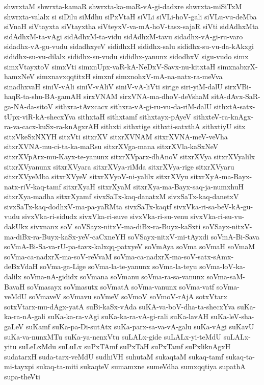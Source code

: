 {shwrxtaM
shwrxta-kamaR
shwrxta-ka-maR-vA-gi-dadxre
shwrxta-miSiTxM
shwrxta-valalx
si
siDilu
siMdhu
siPxVtaH
siVLi
siVLi-hoV-gali
siVLu-vu-deMba
siVnaH
siVtayxta
siVtayxtha
siVteyxV-va-mA-hoV-tasx-sajaR
siVti
sidAdhxMta
sidAdhxM-ta-vAgi
sidAdhxM-ta-vidu
sidAdhxM-tavu
sidadhx-vA-gi-ru-varo
sidadhx-vA-gu-vudu
sidadhxyeV
sididhxH
sididhx-salu
sididhx-su-vu-da-kAkxgi
sididhx-su-vu-dilalx
sididhx-su-vudu
sididhx-yanunx
sidodhxV
sigu-vudo
simx
simxVtayxtoV
simxVti
simxnUpx-vaR-kA-NeDxV-Savx-nu-kitxtaH
simxnabxrX-hamxNeV
simxnavxqqtitxH
simxnf
simxnohxV-mA-na-natx-ra-meVva
sinadhxvaH
siniV-vAli
siniV-vAliV
siniV-vA-liVti
sirige
siri-yiM-dalU
sirxVBi-haqR-ta-shu-BA-gamAH
sirxVNAM
sirxVNA-ma-dhoV-deVshaM
sitA-dAvx-SaR-ga-NA-da-sitoV
sithxra-tAvxcacx
sithxra-vA-gi-ru-vu-da-riM-dalU
sithxtA-satx-tUpx-viR-kA-shecxYva
sithxtaH
sithxtamf
sithxtayx-pAyeV
sithxteV-ra-knAgx-ra-va-cacx-kuSx-ra-knAgxrAH
sithxti
sithxtige
sithxti-satxthA
sithxtiyU
sitx
sitxVkeSxNXYH
sitxVti
sitxrXV
sitxrXVNAM
sitxrXVNA-meV-veVha
sitxrXVNA-mu-ci-ta-ka-maRsu
sitxrXVga-mana
sitxrXVla-kaSxNeV
sitxrXVpArx-mu-Kayx-te-yanunx
sitxrXVparx-dhAnoV
sitxrXVya
sitxrXVyalilx
sitxrXVyanunx
sitxrXVyara
sitxrXVya-riMda
sitxrXVya-rige
sitxrXVyaru
sitxrXVyeMba
sitxrXVyeV
sitxrXVyoV-ni-yalilx
sitxrXVyu
sitxrXyA-ma-Bayx-natx-riV-kaq-tamf
sitxrXyaH
sitxrXyaM
sitxrXya-ma-Bayx-saq-ja-numxhuH
sitxrXya-madha
sitxrXyamf
sivxSaTx-kaq-danatxM
sivxSaTx-kaq-danetxV
sivxSaTx-kaq-dodhxV-ma-pa-yaRMta
sivxSaTx-kaqtf
sivxVka-ri-sa-beV-kA-gu-vudu
sivxVka-ri-sidudx
sivxVka-ri-suve
sivxVka-ri-su-venu
sivxVka-ri-su-vu-dakUkx
sivxnanx
soV
soVSayx-nitxV-ma-diBx-ra-Buyx-kaSxti
soVSayx-nitxV-ma-diBx-ra-Buyx-kaSx-yeV-caCxneYH
soVSayx-nitxV-mi-tAyxdi
soVmA-Bi-Sava
soVmA-Bi-Sa-va-rU-pa-tavx-kalxqq-patxyeV
soVmAya
soVma
soVmaH
soVmaM
soVma-ca-nadxrX-ma-soV-reVvaM
soVma-ca-nadxrX-ma-soV-satx-sAmx-deBxVdaH
soVma-ga-Lige
soVma-la-te-yanunx
soVma-la-teyu
soVma-loV-ka-dalilx
soVma-nA-gididx
soVmana
soVmanu
soVma-ra-sa-vanunx
soVma-saM-BavaH
soVmasayx
soVmasutx
soVmatA
soVma-vanunx
soVma-vatf
soVma-veMdU
soVmaveV
soVmavu
soVmeV
soVmoV
soVmoV-rAjA
sotxVtarx
sotxVtarx-mu-dAgx-yatA
suBi-kaSx-vAda
suKA-va-boV-dha-ta-shecxYva
suKa-ka-ra-nA-gali
suKa-ka-ra-vAgi
suKa-ka-ra-vA-gi-rali
suKa-lavAH
suKa-leV-sha-gaLeV
suKamf
suKa-pa-Di-sutAtx
suKa-parx-sa-va-vA-galu
suKa-vAgi
suKavU
suKa-va-nunxMTu
suKa-ya-nenxVtu
suLALx-gide
suLALx-yi-teMdU
suLALx-yitu
suLeLxMdu
suLuLx
suPxTAmf
suPxTaH
suPxTamf
suPxliknAgxH
sudatarxH
suda-tarx-veMdU
sudhiVH
suhutaM
sukaqtaM
sukaq-tamf
sukaq-ta-mi-tayxpi
sukaq-ta-miti
sukaqteV
sumamxne
sumeVdha
sumxqqtiya
supathA
supa-theVti
}
